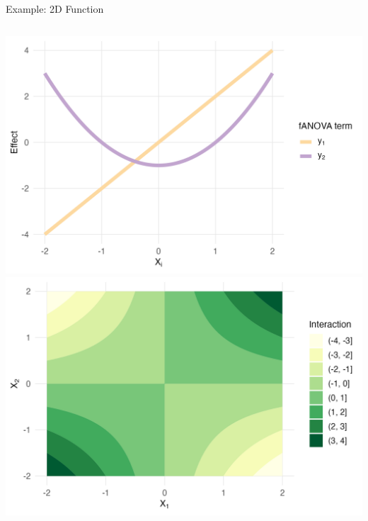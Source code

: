 \begin{frame}{Example: 2D Function} %
  \begin{columns}
      \includegraphics[width=\linewidth]{../images/experiment_section/classical_ex_1_a1p20_a2p00_a11p00_a22p10_a12p10_rhop00_main.png}
      \includegraphics[width=\linewidth]{../images/experiment_section/classical_ex_1_a1p20_a2p00_a11p00_a22p10_a12p10_rhop00_interaction.png}
  \end{columns}
\end{frame}



